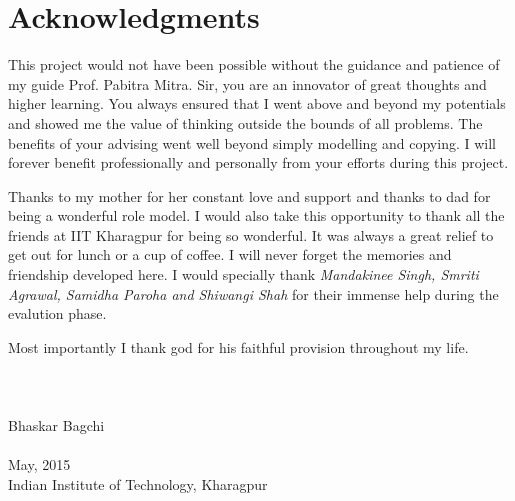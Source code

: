 \cleardoublepage
\chapter*{Acknowledgments}
\vspace{1.0in}
This project would not have been possible without the guidance and patience of my guide Prof. Pabitra Mitra. Sir, you are an innovator of great thoughts and higher learning. You always ensured that I went above and beyond my potentials and showed me the value of thinking outside the bounds of all problems. The benefits of your advising went well beyond simply modelling and copying. I will forever benefit professionally and personally from your efforts during this project.

Thanks to my mother for her constant love and support and thanks to dad for being a wonderful role model. I would also take this opportunity to thank all the friends at IIT Kharagpur for being so wonderful. It was always a great relief to get out for lunch or a cup of coffee. I will never forget the memories and friendship developed here. I would specially thank \textit{Mandakinee Singh, Smriti Agrawal, Samidha Paroha and Shiwangi Shah} for their immense help during the evalution phase.

Most importantly I thank god for his faithful provision throughout my life.
\\
\\
\\ 
\\
Bhaskar Bagchi \\ 
\\
May, 2015\\
{Indian Institute of Technology, Kharagpur}\\
\newpage
